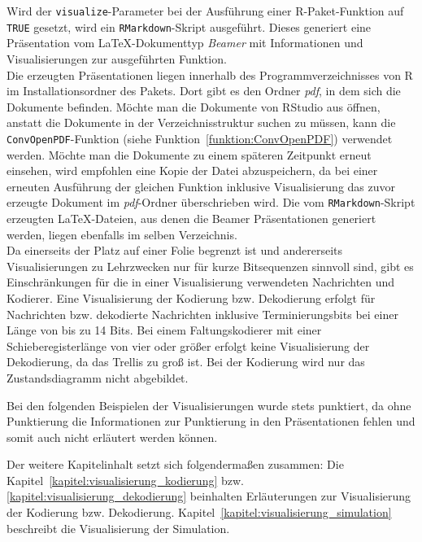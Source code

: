 Wird der \texttt{visualize}-Parameter bei der Ausführung einer R-Paket-Funktion auf \texttt{TRUE} gesetzt, wird ein \texttt{RMarkdown}-Skript ausgeführt. Dieses generiert eine  Präsentation vom \LaTeX -Dokumenttyp \emph{Beamer} mit Informationen und Visualisierungen zur ausgeführten Funktion.
\\
Die erzeugten Präsentationen liegen innerhalb des Programmverzeichnisses von R im Installationsordner des Pakets. Dort gibt es den Ordner \emph{pdf}, in dem sich die Dokumente befinden. Möchte man die Dokumente von RStudio aus öffnen, anstatt die Dokumente in der Verzeichnisstruktur suchen zu müssen, kann die \texttt{ConvOpenPDF}-Funktion (siehe Funktion~\ref{funktion:ConvOpenPDF}) verwendet werden. Möchte man die Dokumente zu einem späteren Zeitpunkt erneut einsehen, wird empfohlen eine Kopie der Datei abzuspeichern, da bei einer erneuten Ausführung der gleichen Funktion inklusive Visualisierung das zuvor erzeugte Dokument im \emph{pdf}-Ordner überschrieben wird. Die vom \texttt{RMarkdown}-Skript erzeugten \LaTeX -Dateien, aus denen die Beamer Präsentationen generiert werden, liegen ebenfalls im selben Verzeichnis.
\\
Da einerseits der Platz auf einer Folie begrenzt ist und andererseits Visualisierungen zu Lehrzwecken nur für kurze Bitsequenzen sinnvoll sind, gibt es Einschränkungen für die in einer Visualisierung verwendeten Nachrichten und Kodierer. Eine Visualisierung der Kodierung bzw. Dekodierung erfolgt für Nachrichten bzw. dekodierte Nachrichten inklusive Terminierungsbits bei einer Länge von bis zu 14 Bits. Bei einem Faltungskodierer mit einer Schieberegisterlänge von vier oder größer erfolgt keine Visualisierung der Dekodierung, da das Trellis zu groß ist. Bei der Kodierung wird nur das Zustandsdiagramm nicht abgebildet.

Bei den folgenden Beispielen der Visualisierungen wurde stets punktiert, da ohne Punktierung die Informationen zur Punktierung in den Präsentationen fehlen und somit auch nicht erläutert werden können.

Der weitere Kapitelinhalt setzt sich folgendermaßen zusammen: Die Kapitel~\ref{kapitel:visualisierung_kodierung} bzw. \ref{kapitel:visualisierung_dekodierung} beinhalten Erläuterungen zur Visualisierung der Kodierung bzw. Dekodierung. Kapitel~\ref{kapitel:visualisierung_simulation} beschreibt die Visualisierung der Simulation.
